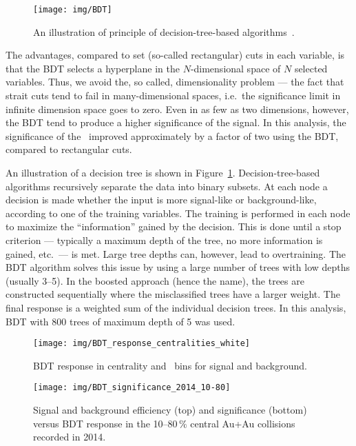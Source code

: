 \begin{figure}[!htb]
\centering
\texttt{[image: img/BDT]}
\caption[An illustration of principle of decision-tree-based algorithms.]{\label{BDT}An illustration of principle of decision-tree-based algorithms~\cite{TMVA}\@.}
\end{figure}

The advantages, compared to set (so-called rectangular) cuts in each variable, is that the BDT selects a hyperplane in the $N$-dimensional space of $N$ selected variables. Thus, we avoid the, so called, dimensionality problem --- the fact that strait cuts tend to fail in many-dimensional spaces, i.e.\ the significance limit in infinite dimension space goes to zero. Even in as few as two dimensions, however, the BDT tend to produce a higher significance of the signal. In this analysis, the significance of the \Lambdac\ improved approximately by a factor of two using the BDT, compared to rectangular cuts.


An illustration of a decision tree is shown in Figure~\ref{BDT}\@. Decision-tree-based algorithms recursively separate the data into binary subsets. At each node a decision is made whether the input is more signal-like or background-like, according to one of the training variables. The training is performed in each node to maximize the ``information'' gained by the decision. This is done until a stop criterion --- typically a maximum depth of the tree, no more information is gained, etc.\ --- is met. Large tree depths can, however, lead to overtraining. The BDT algorithm solves this issue by using a large number of trees with low depths (usually 3--5)\@. In the boosted approach (hence the name), the trees are constructed sequentially where the misclassified trees have a larger weight. The final response is a weighted sum of the individual decision trees. In this analysis, BDT with 800 trees of maximum depth of 5 was used.


\begin{figure}[!htb]
\centering
\texttt{[image: img/BDT\_response\_centralities\_white]}
\caption[BDT response in centrality and \pt\ bins for signal and background.]{\label{BDT_centralities}BDT response in centrality and \pt\ bins for signal and background.}
\end{figure}


\begin{figure}[!p]
\vspace{-0.7cm}
\centering
\texttt{[image: img/BDT\_significance\_2014\_10-80]}
\vspace{-1cm}
\caption[Signal and background efficiency and significance versus BDT response in the 10--80$\,\%$ central Au+Au collisions recorded in 2014.]{\label{BDT_sig_2014_pt}Signal and background efficiency (top) and significance (bottom) versus BDT response in the 10--80$\,\%$ central Au+Au collisions recorded in 2014.}
\end{figure}

